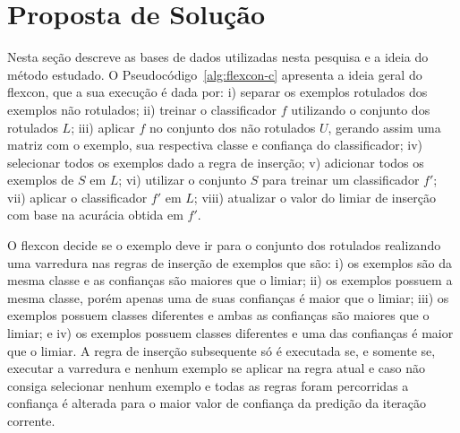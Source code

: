 


\section{Proposta de Solução}
    \label{sec:proposta-de-solucao}

    Nesta seção descreve as bases de dados utilizadas nesta pesquisa e a ideia do método estudado. O Pseudocódigo~\ref{alg:flexcon-c} apresenta a ideia geral do \ac{flexcon}, que a sua execução é dada por: i) separar os exemplos rotulados dos exemplos não rotulados; ii) treinar o classificador $f$ utilizando o conjunto dos rotulados $L$; iii) aplicar $f$ no conjunto dos não rotulados $U$, gerando assim uma matriz com o exemplo, sua respectiva classe e confiança do classificador; iv) selecionar todos os exemplos dado a regra de inserção; v) adicionar todos os exemplos de $S$ em $L$; vi) utilizar o conjunto $S$ para treinar um classificador $f'$; vii) aplicar o classificador $f'$ em $L$; viii) atualizar o valor do limiar de inserção com base na acurácia obtida em $f'$.

    O \ac{flexcon} decide se o exemplo deve ir para o conjunto dos rotulados realizando uma varredura nas regras de inserção de exemplos que são: i) os exemplos são da mesma classe e as confianças são maiores que o limiar; ii) os exemplos possuem a mesma classe, porém apenas uma de suas confianças é maior que o limiar; iii) os exemplos possuem classes diferentes e ambas as confianças são maiores que o limiar; e iv) os exemplos possuem classes diferentes e uma das confianças é maior que o limiar. A regra de inserção subsequente só é executada se, e somente se, executar a varredura e nenhum exemplo se aplicar na regra atual e caso não consiga selecionar nenhum exemplo e todas as regras foram percorridas a confiança é alterada para o maior valor de confiança da predição da iteração corrente.

